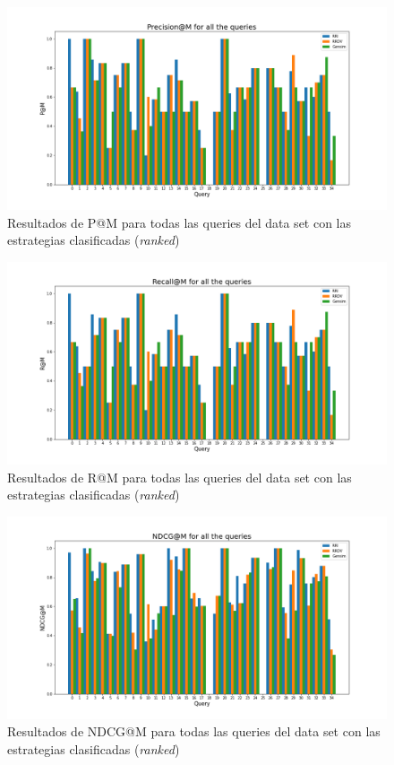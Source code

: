 \begin{figure}[H]
    \centering
    \includegraphics[width=\textwidth]{doc/images/P@M_Ranked.png}
    \caption{Resultados de P@M para todas las queries del data set con las estrategias clasificadas (\textit{ranked})}
    \label{fig:rankedP}
\end{figure}

\begin{figure}[H]
    \centering
    \includegraphics[width=\textwidth]{doc/images/R@M_Ranked.png}
    \caption{Resultados de R@M para todas las queries del data set con las estrategias clasificadas (\textit{ranked})}
    \label{fig:rankedR}
\end{figure}


\begin{figure}[H]
    \centering
    \includegraphics[width=\textwidth]{doc/images/NDCG@M_Ranked.png}
    \caption{Resultados de NDCG@M para todas las queries del data set con las estrategias clasificadas (\textit{ranked})}
    \label{fig:rankedNDCG}
\end{figure}



